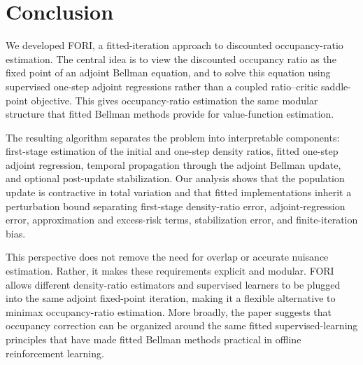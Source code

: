 \documentclass{article}
\newcommand{\1}{\mathbf{1}}
\theoremstyle{plain}
\theoremstyle{definition}
\theoremstyle{remark}
\begin{document}
\section{Conclusion}

We developed \textsc{FORI}, a fitted-iteration approach to discounted
occupancy-ratio estimation. The central idea is to view the discounted
occupancy ratio as the fixed point of an adjoint Bellman equation, and to solve
this equation using supervised one-step adjoint regressions rather than a
coupled ratio--critic saddle-point objective. This gives occupancy-ratio
estimation the same modular structure that fitted Bellman methods provide for
value-function estimation.

The resulting algorithm separates the problem into interpretable components:
first-stage estimation of the initial and one-step density ratios, fitted
one-step adjoint regression, temporal propagation through the adjoint Bellman
update, and optional post-update stabilization. Our analysis shows that the
population update is contractive in total variation and that fitted
implementations inherit a perturbation bound separating first-stage
density-ratio error, adjoint-regression error, approximation and excess-risk
terms, stabilization error, and finite-iteration bias.

This perspective does not remove the need for overlap or accurate nuisance
estimation. Rather, it makes these requirements explicit and modular.
\textsc{FORI} allows different density-ratio estimators and supervised learners
to be plugged into the same adjoint fixed-point iteration, making it a flexible
alternative to minimax occupancy-ratio estimation. More broadly, the paper
suggests that occupancy correction can be organized around the same fitted
supervised-learning principles that have made fitted Bellman methods practical
in offline reinforcement learning.
\end{document}
